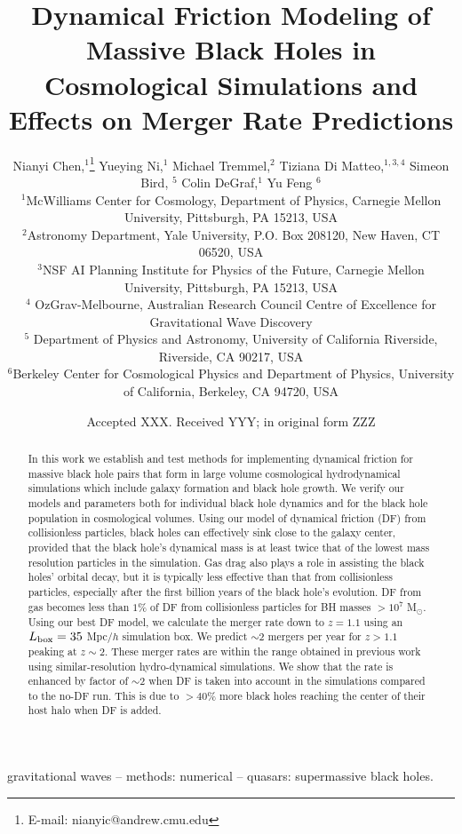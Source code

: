 \documentclass[fleqn,usenatbib]{mnras}
\title[BH Dynamics and Mergers]{Dynamical Friction Modeling of Massive Black Holes in Cosmological Simulations and Effects on Merger Rate Predictions}
\author[N.Chen et al.]{
Nianyi Chen,$^{1}$\thanks{E-mail: nianyic@andrew.cmu.edu}
Yueying Ni,$^{1}$
Michael Tremmel,$^{2}$
Tiziana Di Matteo,$^{1,3,4}$ Simeon Bird, $^5$
Colin DeGraf,$^{1}$
\newauthor
 Yu Feng $^6$
\\
$^{1}$McWilliams Center for Cosmology, Department of Physics, Carnegie Mellon University, Pittsburgh, PA 15213, USA\\
$^{2}$Astronomy Department, Yale University, P.O. Box 208120, New Haven, CT 06520, USA\\
$^3$NSF AI Planning Institute for Physics of the Future, 
Carnegie   Mellon  University, Pittsburgh, PA 15213, USA \\
$^{4}$ OzGrav-Melbourne, Australian Research Council Centre of Excellence for Gravitational Wave Discovery\\
$^{5}$ Department of Physics and Astronomy, University of California Riverside, Riverside, CA 90217, USA\\
$^{6}$Berkeley Center for Cosmological Physics and Department of Physics, University of California, Berkeley, CA 94720, USA
}
\date{Accepted XXX. Received YYY; in original form ZZZ}
\begin{document}
\label{firstpage}
\pagerange{\pageref{firstpage}--\pageref{lastpage}}
\maketitle

\begin{abstract}
In this work we establish and test methods for implementing dynamical friction for massive black hole pairs that form in large volume cosmological hydrodynamical simulations which include galaxy formation and black hole growth. We verify our models and parameters both for individual black hole dynamics and for the black hole population in cosmological volumes. Using our model of dynamical friction (DF) from collisionless particles, black holes can effectively sink close to the galaxy center, provided that the black hole's dynamical mass is at least twice that of the lowest mass resolution particles in the simulation. Gas drag also plays a role in assisting the black holes' orbital decay, but it is typically less effective than that from collisionless particles, especially after the first billion years of the black hole's evolution. DF from gas becomes less than $1\%$ of DF from collisionless particles for BH masses $> 10^{7}$ M$_{\odot}$.
Using our best DF model, we calculate the merger rate down to $z=1.1$ using an $L_{\rm box}=35$ Mpc$/h$ simulation box.  We predict $\sim 2$ mergers per year for $z>1.1$ peaking at $z\sim 2$.
These merger rates are within the range obtained in previous work using similar-resolution hydro-dynamical simulations. We show that the rate is enhanced by factor of $\sim 2$ when DF is taken into account in the simulations compared to the no-DF run. This is due to $>40\%$ more black holes reaching the center of their host halo when DF is added.


\end{abstract}
\begin{keywords}
gravitational waves -- methods: numerical -- quasars: supermassive black holes.
\end{keywords}











% 
\end{document}
